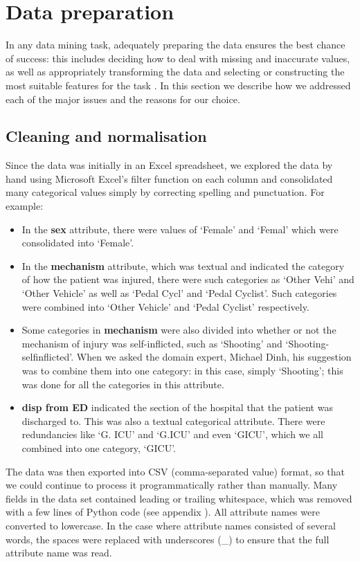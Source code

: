 \section{Data preparation}
In any data mining task, adequately preparing the data ensures the best
chance of success: this includes deciding how to deal with missing and
inaccurate values, as well as appropriately transforming the data
\citep{Witten2005} and selecting or constructing the most suitable features
for the task \citep{Kotsiantis2006}.
In this section we describe how we addressed each of
the major issues and the reasons for our choice.

\subsection{Cleaning and normalisation} %
Since the data was initially in an Excel spreadsheet, we explored the data
by hand using Microsoft Excel's filter function on each column and
consolidated many categorical values simply
by correcting spelling and punctuation. For example:
\begin{itemize}
\item In the \textbf{sex} attribute, there were values of `Female' and
`Femal' which were consolidated into `Female'.
\item In the \textbf{mechanism} attribute, which was textual and indicated
the category of how the patient was injured, there were such categories as
`Other Vehi' and `Other Vehicle' as well as `Pedal Cycl' and `Pedal Cyclist'.
Such categories were combined into `Other Vehicle' and `Pedal Cyclist'
respectively.
\item Some categories in \textbf{mechanism} were also divided into whether or
not the mechanism of injury was self-inflicted, such as `Shooting' and
`Shooting-selfinflicted'. When we asked the domain expert, Michael Dinh, his
suggestion was to combine them into one category: in this case, simply
`Shooting'; this was done for all the categories in this attribute.
\item \textbf{disp from ED} indicated the section of the hospital that the
patient was discharged to. This was also a textual categorical attribute.
There were redundancies like `G. ICU' and `G.ICU' and even `GICU', which we
all combined into one category, `GICU'.
\end{itemize}

The data was then exported into CSV (comma-separated value) format, so that
we could continue to process it programmatically rather than manually. Many
fields in the data set contained leading or trailing whitespace, which was
removed with a few lines of Python code (see appendix ). All attribute names were converted to lowercase. In the case
where attribute names consisted of several words, the spaces were replaced
with underscores (\_) to ensure that the full attribute name was read.

